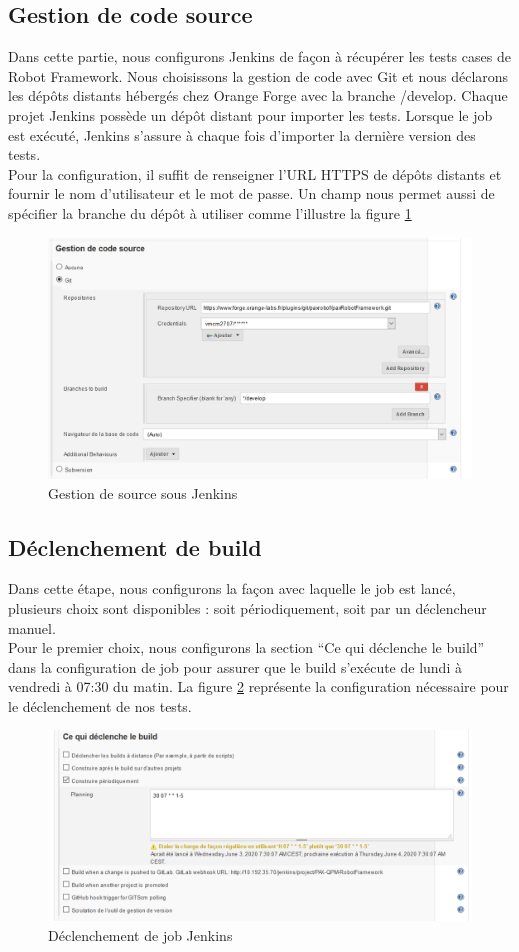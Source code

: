 \subsection{Gestion de code source}
Dans cette partie, nous configurons Jenkins de façon à récupérer les tests cases de Robot Framework. Nous choisissons la gestion de code avec Git et nous déclarons les dépôts distants hébergés chez Orange Forge avec la branche /develop. Chaque projet Jenkins possède un dépôt distant pour importer les tests. Lorsque le job est exécuté, Jenkins s’assure à chaque fois d’importer la dernière version des tests.\\Pour la configuration, il suffit de renseigner l’URL HTTPS de dépôts distants et fournir le nom d’utilisateur et le mot de passe. Un champ nous permet aussi de spécifier la branche du dépôt à utiliser comme l'illustre la figure \ref{fig:source-jenkins}
\begin{figure}[H]
	\centering
	\includegraphics[width=0.9\linewidth]{img/jenkins/source}
	\caption[Gestion de source sous Jenkins]{Gestion de source sous Jenkins}
	\label{fig:source-jenkins}
\end{figure}

\subsection{Déclenchement de build }
Dans cette étape, nous configurons la façon avec laquelle le job est lancé, plusieurs choix sont disponibles : soit périodiquement, soit par un déclencheur manuel.\\
Pour le premier choix, nous configurons la section “Ce qui déclenche le build” dans la configuration de job pour assurer que le build s'exécute de lundi à vendredi à 07:30 du matin.
La figure \ref{fig:declanchement} représente la configuration nécessaire pour le déclenchement de nos tests.
\begin{figure}[H]
	\centering
	\includegraphics[width=0.8\linewidth]{img/jenkins/declanchement}
	\caption[Déclenchement de job Jenkins]{Déclenchement de job Jenkins}
	\label{fig:declanchement}
\end{figure}

